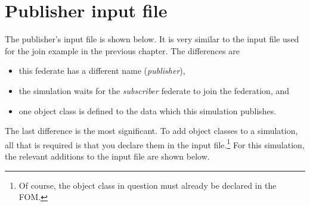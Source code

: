 \section{Publisher input file}

The publisher's input file is shown below.
It is very similar to the input file used for the join example
in the previous chapter.
The differences are
\begin{itemize}
\item{
  this federate has a different name ({\em publisher}),
}
\item{
  the simulation waits for the {\em subscriber} federate to
  join the federation, and
}
\item{
  one object class is defined to the data which this simulation
  publishes.
}
\end{itemize}

The last difference is the most significant.
To add object classes to a simulation, all that is required is that
you declare them in the input file.\footnote{
  Of course, the object class in question must already be declared in
  the FOM.
}
For this simulation,
the relevant additions to the input file are shown below.

